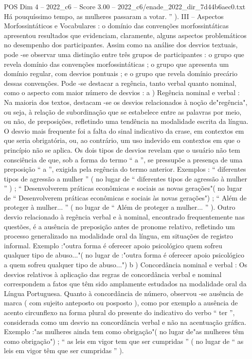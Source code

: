 \begin{textsample}{POS Dim 4 – 2022\_c6 – Score 3.00 – 2022\_c6/enade\_2022\_dir\_7d44b6aec0.txt}
Há pouquíssimo tempo, as mulheres passaram a votar. ” ).
III – Aspectos Morfossintáticos e Vocabulares : o domínio das convenções morfossintáticas apresentou resultados que evidenciam, claramente, alguns aspectos problemáticos no desempenho dos participantes.
Assim como na análise dos desvios textuais, pode -se observar uma distinção entre três grupos de participantes : o grupo que revela domínio das convenções morfossintáticas ; o grupo que apresenta um domínio regular, com desvios pontuais ; e o grupo que revela domínio precário dessas convenções.
Pode -se destacar a regência, tanto verbal quanto nominal, como o aspecto com maior número de desvios : a ) Regência nominal e verbal : Na maioria dos textos, destacam -se os desvios relacionados à noção de"regência", ou seja, à relação de subordinação que se estabelece entre as palavras por meio, ou não, de preposições, refletindo uma tendência na modalidade escrita da língua.
O desvio mais frequente foi a falta do sinal indicativo da crase, em contextos em que seria obrigatória, ou, ao contrário, um uso indevido em contextos em que o princípio não se aplica.
Os dois tipos de desvios revelam que o usuário não tem consciência de que, sob a forma do termo “ a ”, se pressupõe a presença de uma preposição “ a ”, exigida pela regência do termo anterior.
Exemplos : “ diferentes tipos de agressão a mulher ” ( no lugar de “ diferentes tipos de agressão à mulher ” ) ; “ Desenvolverem práticas econômicas e sociais as novas gerações"( no lugar de “ Desenvolverem práticas econômicas e sociais às novas gerações") ; “ Além de proteger à mulher... ” ( no lugar de “ Além de proteger a mulher... ” ).
Outro desvio relacionado à regência verbal e à nominal, encontrado frequentemente nas questões, é a ausência de preposição antes de pronome relativo, refletindo um processo generalizado na modalidade oral da língua, em situações de registro informal.
Exemplo :"outra forma é oferecer apoio psicológico quem sofreu qualquer tipo de abuso..."( no lugar de :"outra forma é oferecer apoio psicológico a quem sofreu qualquer tipo de abuso...") b ) Concordância nominal e verbal : Os desvios relativos à aplicação das regras de concordância verbal e nominal correspondem a fatos que têm sido amplamente estudados na modalidade oral da Língua Portuguesa.
Quanto à concordância de número, observou -se ausência de marca ( com sujeito anteposto ou posposto ), como por exemplo a ausência de acento circunflexo na forma plural do presente do indicativo do verbo “ ter ”, considerada como um desvio na concordância verbal e não na acentuação gráfica.
Exemplo :"as mulheres ainda tem como obrigação"( no lugar de"as mulheres têm como obrigação") ; “ as leis em vigor tem que ser cumpridas ” ( no lugar de “ as leis em vigor têm que ser cumpridas ” ).

\end{textsample}
